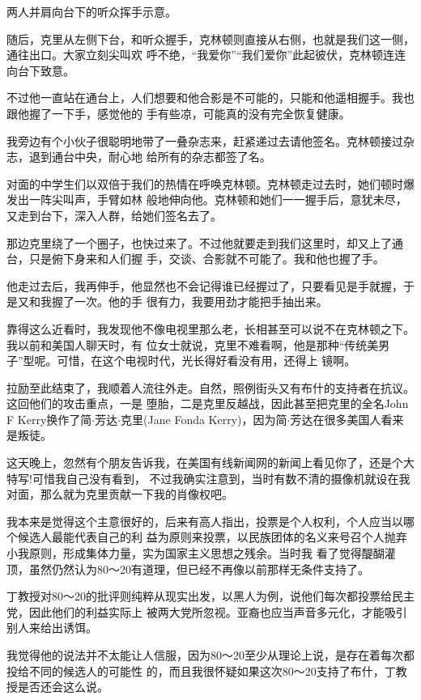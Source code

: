 ﻿\documentclass[11pt]{article}
\begin{document}
两人并肩向台下的听众挥手示意。

随后，克里从左侧下台，和听众握手，克林顿则直接从右侧，也就是我们这一侧，通往出口。大家立刻尖叫欢
呼不绝，``我爱你''``我们爱你''此起彼伏，克林顿连连向台下致意。

不过他一直站在通台上，人们想要和他合影是不可能的，只能和他遥相握手。我也跟他握了一下手，感觉他的
手有些凉，可能真的没有完全恢复健康。

我旁边有个小伙子很聪明地带了一叠杂志来，赶紧递过去请他签名。克林顿接过杂志，退到通台中央，耐心地
给所有的杂志都签了名。

对面的中学生们以双倍于我们的热情在呼唤克林顿。克林顿走过去时，她们顿时爆发出一阵尖叫声，手臂如林
般地伸向他。克林顿和她们一一握手后，意犹未尽，又走到台下，深入人群，给她们签名去了。

那边克里绕了一个圈子，也快过来了。不过他就要走到我们这里时，却又上了通台，只是俯下身来和人们握
手，交谈、合影就不可能了。我和他也握了手。

他走过去后，我再伸手，他显然也不会记得谁已经握过了，只要看见是手就握，于是又和我握了一次。他的手
很有力，我要用劲才能把手抽出来。

靠得这么近看时，我发现他不像电视里那么老，长相甚至可以说不在克林顿之下。我以前和美国人聊天时，有
位女士就说，克里不难看啊，他是那种``传统美男子''型呢。可惜，在这个电视时代，光长得好看没有用，还得上
镜啊。

拉励至此结束了，我顺着人流往外走。自然，照例街头又有布什的支持者在抗议。这回他们的攻击重点，一是
堕胎，二是克里反越战，因此甚至把克里的全名John F Kerry换作了简$\cdot$芳达$\cdot$克里(Jane Fonda
Kerry)，因为简$\cdot$芳达在很多美国人看来是叛徒。

这天晚上，忽然有个朋友告诉我，在美国有线新闻网的新闻上看见你了，还是个大特写!可惜我自己没有看到，
不过我确实注意到，当时有数不清的摄像机就设在我对面，那么就为克里贡献一下我的肖像权吧。


我本来是觉得这个主意很好的，后来有高人指出，投票是个人权利，个人应当以哪个候选人最能代表自己的利
益为原则来投票，以民族团体的名义来号召个人抛弃小我原则，形成集体力量，实为国家主义思想之残余。当时我
看了觉得醍醐灌顶，虽然仍然认为80～20有道理，但已经不再像以前那样无条件支持了。

丁教授对80～20的批评则纯粹从现实出发，以黑人为例，说他们每次都投票给民主党，因此他们的利益实际上
被两大党所忽视。亚裔也应当声音多元化，才能吸引别人来给出诱饵。

我觉得他的说法并不太能让人信服，因为80～20至少从理论上说，是存在着每次都投给不同的候选人的可能性
的，而且我很怀疑如果这次80～20支持了布什，丁教授是否还会这么说。
\end{document}
